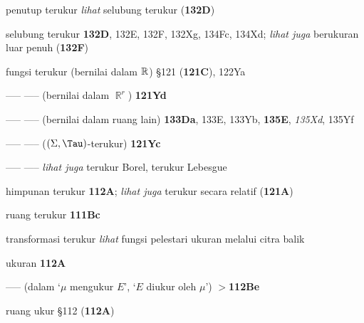 





penutup terukur {\it lihat} selubung terukur ({\bf 132D})

selubung terukur {\bf 132D}, 132E, 132F, 132Xg, 134Fc, 134Xd;  
  {\it lihat juga }
  berukuran luar penuh ({\bf 132F})



fungsi terukur (bernilai dalam $\Bbb R$) \S121 ({\bf 121C}),
122Ya

----- -----  (bernilai dalam $\BbbR^r$) {\bf 121Yd}

----- -----  (bernilai dalam ruang lain) {\bf 133Da}, 133E, 133Yb,
{\bf 135E}, {\it 135Xd}, 135Yf  

----- -----  ($(\Sigma,\Tau)$-terukur) {\bf 121Yc}

----- -----  {\it lihat juga} terukur Borel, terukur Lebesgue






himpunan terukur {\bf 112A};
  {\it lihat juga }
terukur secara relatif ({\bf 121A})


ruang terukur {\bf 111Bc}



transformasi terukur
  {\it lihat} fungsi pelestari ukuran melalui citra balik

ukuran {\bf 112A}

----- (dalam `$\mu$ mengukur $E$', `$E$ diukur oleh $\mu$') {\bf $\pmb{>}$112Be}














































ruang ukur \S112 ({\bf 112A})


















